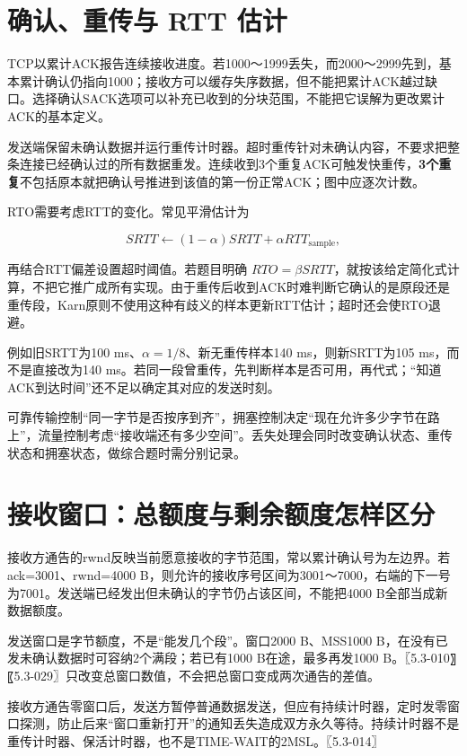 \section{确认、重传与 RTT 估计}\label{cn-05-06}

TCP以累计ACK报告连续接收进度。若1000～1999丢失，而2000～2999先到，基本累计确认仍指向1000；接收方可以缓存失序数据，但不能把累计ACK越过缺口。选择确认SACK选项可以补充已收到的分块范围，不能把它误解为更改累计ACK的基本定义。

发送端保留未确认数据并运行重传计时器。超时重传针对未确认内容，不要求把整条连接已经确认过的所有数据重发。连续收到3个重复ACK可触发快重传，\textbf{3个重复}不包括原本就把确认号推进到该值的第一份正常ACK；图中应逐次计数。

RTO需要考虑RTT的变化。常见平滑估计为

\[SRTT\leftarrow(1-\alpha)SRTT+\alpha RTT_{\mathrm{sample}},\]

再结合RTT偏差设置超时阈值。若题目明确 \(RTO=\beta SRTT\)，就按该给定简化式计算，不把它推广成所有实现。由于重传后收到ACK时难判断它确认的是原段还是重传段，Karn原则不使用这种有歧义的样本更新RTT估计；超时还会使RTO退避。

例如旧SRTT为100 ms、\(\alpha=1/8\)、新无重传样本140 ms，则新SRTT为105 ms，而不是直接改为140 ms。若同一段曾重传，先判断样本是否可用，再代式；``知道ACK到达时间''还不足以确定其对应的发送时刻。

可靠传输控制``同一字节是否按序到齐''，拥塞控制决定``现在允许多少字节在路上''，流量控制考虑``接收端还有多少空间''。丢失处理会同时改变确认状态、重传状态和拥塞状态，做综合题时需分别记录。

\section{接收窗口：总额度与剩余额度怎样区分}\label{cn-05-07}

接收方通告的rwnd反映当前愿意接收的字节范围，常以累计确认号为左边界。若ack=3001、rwnd=4000 B，则允许的接收序号区间为3001～7000，右端的下一号为7001。发送端已经发出但未确认的字节仍占该区间，不能把4000 B全部当成新数据额度。

发送窗口是字节额度，不是``能发几个段''。窗口2000 B、MSS1000 B，在没有已发未确认数据时可容纳2个满段；若已有1000 B在途，最多再发1000 B。〖5.3-010〗〖5.3-029〗只改变总窗口数值，不会把总窗口变成两次通告的差值。

接收方通告零窗口后，发送方暂停普通数据发送，但应有持续计时器，定时发零窗口探测，防止后来``窗口重新打开''的通知丢失造成双方永久等待。持续计时器不是重传计时器、保活计时器，也不是TIME-WAIT的2MSL。〖5.3-014〗

